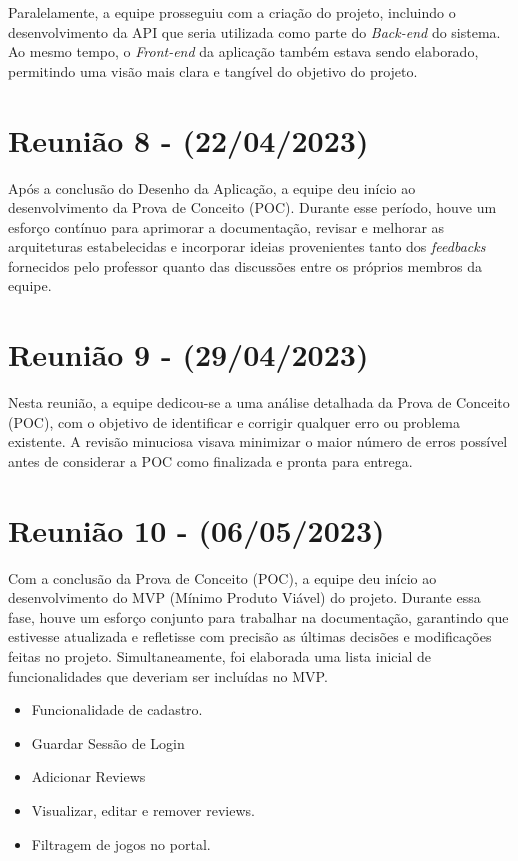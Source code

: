 \begin{apendicesenv}
Paralelamente, a equipe prosseguiu com a criação do projeto, incluindo o desenvolvimento da API que seria utilizada como parte do \textit{\gls{Back-end}} do sistema. Ao mesmo tempo, o \textit{\gls{Front-end}} da aplicação também estava sendo elaborado, permitindo uma visão mais clara e tangível do objetivo do projeto. 

\section{Reunião 8 - (22/04/2023)}
Após a conclusão do Desenho da Aplicação, a equipe deu início ao desenvolvimento da Prova de Conceito (POC). Durante esse período, houve um esforço contínuo para aprimorar a documentação, revisar e melhorar as arquiteturas estabelecidas e incorporar ideias provenientes tanto dos \textit{feedbacks} fornecidos pelo professor quanto das discussões entre os próprios membros da equipe.

\section{Reunião 9 - (29/04/2023)}
Nesta reunião, a equipe dedicou-se a uma análise detalhada da Prova de Conceito (POC), com o objetivo de identificar e corrigir qualquer erro ou problema existente. A revisão minuciosa visava minimizar o maior número de erros possível antes de considerar a POC como finalizada e pronta para entrega.

\section{Reunião 10 - (06/05/2023)}
Com a conclusão da Prova de Conceito (POC), a equipe deu início ao desenvolvimento do MVP (Mínimo Produto Viável) do projeto. Durante essa fase, houve um esforço conjunto para trabalhar na documentação, garantindo que estivesse atualizada e refletisse com precisão as últimas decisões e modificações feitas no projeto. Simultaneamente, foi elaborada uma lista inicial de funcionalidades que deveriam ser incluídas no MVP.

\begin{itemize}
    \item Funcionalidade de cadastro.
    \item Guardar Sessão de Login 
    \item Adicionar Reviews 
    \item Visualizar, editar e remover reviews.
    \item Filtragem de jogos no portal.
\end{itemize}


\end{apendicesenv}
